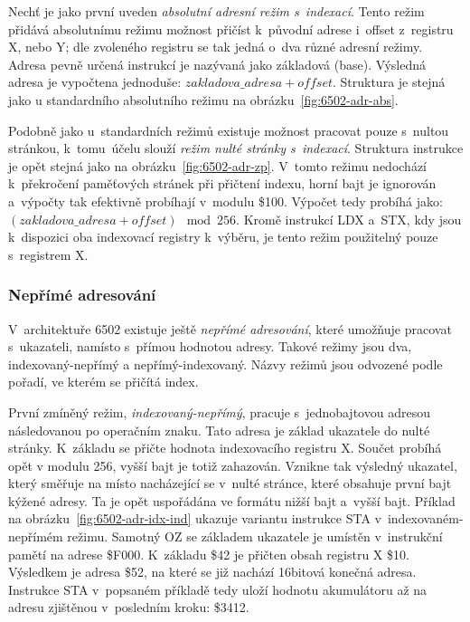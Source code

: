 Nechť je jako první uveden \emph{absolutní adresní režim s~indexací}. Tento režim přidává absolutnímu režimu možnost přičíst k~původní adrese i~offset z~registru X, nebo Y; dle zvoleného registru se tak jedná o~dva různé adresní režimy. Adresa pevně určená instrukcí je nazývaná jako základová (base). Výsledná adresa je vypočtena jednoduše: $zakladova\_adresa + offset$. Struktura je stejná jako u standardního absolutního režimu na obrázku~\ref{fig:6502-adr-abs}.

Podobně jako u~standardních režimů existuje možnost pracovat pouze s~nultou stránkou, k~tomu~účelu slouží \emph{režim nulté stránky s~indexací}. Struktura instrukce je opět stejná jako na obrázku~\ref{fig:6502-adr-zp}. V~tomto režimu nedochází k~překročení paměťových stránek při přičtení indexu, horní bajt je ignorován a~výpočty tak efektivně probíhají v~modulu \$100. Výpočet tedy probíhá jako: $(zakladova\_adresa + offset) \mod 256$. Kromě instrukcí LDX a~STX, kdy jsou k~dispozici oba indexovací registry k~výběru, je tento režim použitelný pouze s~registrem X.

\subsubsection{Nepřímé adresování}
V~architektuře 6502 existuje ještě \emph{nepřímé adresování}, které umožňuje pracovat s~ukazateli, namísto s~přímou hodnotou adresy. Takové režimy jsou dva, indexovaný-nepřímý a nepřímý-indexovaný. Názvy režimů jsou odvozené podle pořadí, ve kterém se přičítá index.

První zmíněný režim, \emph{indexovaný-nepřímý}, pracuje s~jednobajtovou adresou následovanou po operačním znaku. Tato adresa je základ ukazatele do nulté stránky. K~základu se přičte hodnota indexovacího registru X. Součet probíhá opět v modulu 256, vyšší bajt je totiž zahazován. Vznikne tak výsledný ukazatel, který směřuje na místo nacházející se v~nulté stránce, které obsahuje první bajt kýžené adresy. Ta je opět uspořádána ve formátu nižší bajt a~vyšší bajt. Příklad na obrázku~\ref{fig:6502-adr-idx-ind} ukazuje variantu instrukce STA v~indexovaném-nepřímém režimu. Samotný OZ se základem ukazatele je umístěn v~instrukční pamětí na adrese \$F000. K~základu \$42 je přičten obsah registru X \$10. Výsledkem je adresa \$52, na které se již nachází 16bitová konečná adresa. Instrukce STA v~popsaném příkladě tedy uloží hodnotu akumulátoru až na adresu zjištěnou v~posledním kroku: \$3412.

